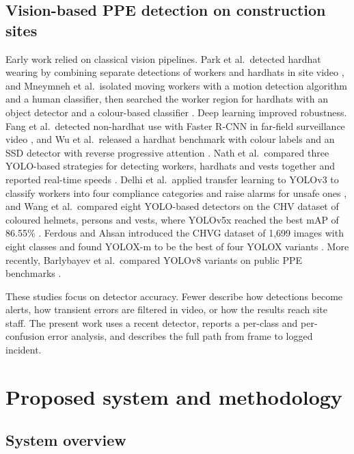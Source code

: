 \documentclass[preprint,12pt]{elsarticle}
\begin{document}
\subsection{Vision-based PPE detection on construction sites}

Early work relied on classical vision pipelines. Park et al.\ detected hardhat wearing by combining separate detections of workers and hardhats in site video \cite{park2015hardhat}, and Mneymneh et al.\ isolated moving workers with a motion detection algorithm and a human classifier, then searched the worker region for hardhats with an object detector and a colour-based classifier \cite{mneymneh2019hardhat}. Deep learning improved robustness. Fang et al.\ detected non-hardhat use with Faster R-CNN in far-field surveillance video \cite{fang2018hardhat}, and Wu et al.\ released a hardhat benchmark with colour labels and an SSD detector with reverse progressive attention \cite{wu2019hardhat,liu2016ssd}. Nath et al.\ compared three YOLO-based strategies for detecting workers, hardhats and vests together and reported real-time speeds \cite{nath2020ppe}. Delhi et al.\ applied transfer learning to YOLOv3 to classify workers into four compliance categories and raise alarms for unsafe ones \cite{delhi2020ppe}, and Wang et al.\ compared eight YOLO-based detectors on the CHV dataset of coloured helmets, persons and vests, where YOLOv5x reached the best mAP of 86.55\% \cite{wang2021ppe}. Ferdous and Ahsan introduced the CHVG dataset of 1,699 images with eight classes and found YOLOX-m to be the best of four YOLOX variants \cite{ferdous2022ppe}. More recently, Barlybayev et al.\ compared YOLOv8 variants on public PPE benchmarks \cite{barlybayev2024yolov8}.

These studies focus on detector accuracy. Fewer describe how detections become alerts, how transient errors are filtered in video, or how the results reach site staff. The present work uses a recent detector, reports a per-class and per-confusion error analysis, and describes the full path from frame to logged incident.

\section{Proposed system and methodology}
\label{sec:method}

\subsection{System overview}
\end{document}
